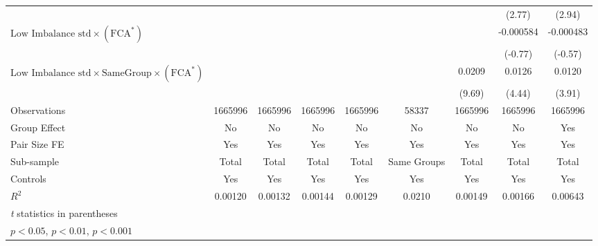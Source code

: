 {\begin{tabular}{l*{8}{c}}
                &                  &                  &                  &                  &                  &                  &   (2.77)         &   (2.94)         \\
[1em]
 $ \text{Low Imbalance std} \times (\text{FCA}^*)  $ &                  &                  &                  &                  &                  &                  &-0.000584         &-0.000483         \\
                &                  &                  &                  &                  &                  &                  &  (-0.77)         &  (-0.57)         \\
[1em]
 $ \text{Low Imbalance std} \times {\text{SameGroup} } \times (\text{FCA}^*)  $ &                  &                  &                  &                  &                  &   0.0209\sym{***}&   0.0126\sym{***}&   0.0120\sym{***}\\
                &                  &                  &                  &                  &                  &   (9.69)         &   (4.44)         &   (3.91)         \\
\hline
Observations    &  1665996         &  1665996         &  1665996         &  1665996         &    58337         &  1665996         &  1665996         &  1665996         \\
Group Effect    &       No         &       No         &       No         &       No         &       No         &       No         &       No         &      Yes         \\
Pair Size FE    &      Yes         &      Yes         &      Yes         &      Yes         &      Yes         &      Yes         &      Yes         &      Yes         \\
Sub-sample      &    Total         &    Total         &    Total         &    Total         &Same Groups         &    Total         &    Total         &    Total         \\
Controls        &      Yes         &      Yes         &      Yes         &      Yes         &      Yes         &      Yes         &      Yes         &      Yes         \\
$ R^2 $         &  0.00120         &  0.00132         &  0.00144         &  0.00129         &   0.0210         &  0.00149         &  0.00166         &  0.00643         \\
\hline\hline
\multicolumn{9}{l}{\footnotesize \textit{t} statistics in parentheses}\\
\multicolumn{9}{l}{\footnotesize \sym{*} \(p<0.05\), \sym{**} \(p<0.01\), \sym{***} \(p<0.001\)}\\
\end{tabular}
}
